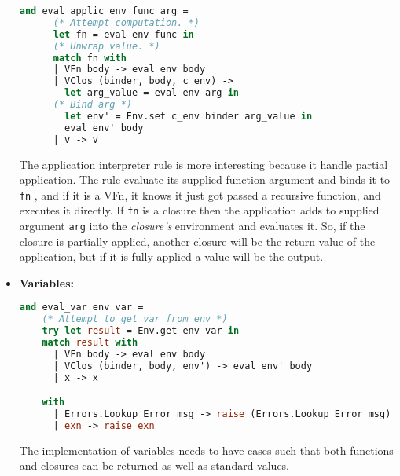 \documentclass{l4proj}
\begin{document}
\begin{itemize}
   
    \begin{lstlisting}[language=Caml, caption=The PyFunc interpreter's application rule.]
    and eval_applic env func arg =
      (* Attempt computation. *)
      let fn = eval env func in
      (* Unwrap value. *)
      match fn with 
      | VFn body -> eval env body
      | VClos (binder, body, c_env) -> 
        let arg_value = eval env arg in
      (* Bind arg *)
        let env' = Env.set c_env binder arg_value in
        eval env' body 
      | v -> v
    \end{lstlisting}
    The application interpreter rule is more interesting because it handle partial application.
    The rule evaluate its supplied function argument and binds it to \texttt{fn} , and if it is a VFn, it knows it just got passed a recursive function, and executes it directly.
    If \texttt{fn} is a closure then the application adds to supplied argument \texttt{arg} into the \emph{closure's} environment and evaluates it.
    So, if the closure is partially applied, another closure will be the return value of the application, but if it is fully applied a value will be the output.
    \item \textbf{Variables:}
    
    \begin{lstlisting}[language=Caml, caption=The PyFunc interpreter's rule for variables.]
    and eval_var env var =
    (* Attempt to get var from env *)
    try let result = Env.get env var in
    match result with
      | VFn body -> eval env body
      | VClos (binder, body, env') -> eval env' body
      | x -> x

    with
      | Errors.Lookup_Error msg -> raise (Errors.Lookup_Error msg)
      | exn -> raise exn
\end{lstlisting}
    The implementation of variables needs to have cases such that both functions and closures can be returned as well as standard values.

\end{itemize}






\end{document}
